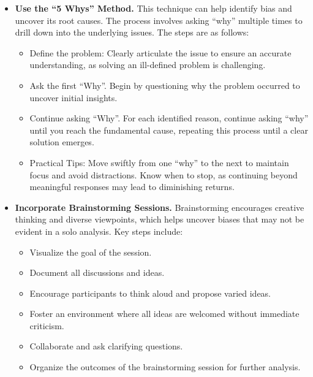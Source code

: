 \begin{itemize} 
    \item \textbf{Use the ``5 Whys'' Method.} This technique can help identify bias and uncover its root causes. The process involves asking ``why'' multiple times to drill down into the underlying issues. The steps are as follows:
        \begin{itemize} 
            \item Define the problem: Clearly articulate the issue to ensure an accurate understanding, as solving an ill-defined problem is challenging. 
            \item Ask the first ``Why''. Begin by questioning why the problem occurred to uncover initial insights. 
            \item Continue asking ``Why''. For each identified reason, continue asking ``why'' until you reach the fundamental cause, repeating this process until a clear solution emerges. 
            \item Practical Tips: Move swiftly from one ``why'' to the next to maintain focus and avoid distractions. Know when to stop, as continuing beyond meaningful responses may lead to diminishing returns. 
    \end{itemize}
    
    \item \textbf{Incorporate Brainstorming Sessions.}  Brainstorming encourages creative thinking and diverse viewpoints, which helps uncover biases that may not be evident in a solo analysis. Key steps include:
        \begin{itemize}
            \item Visualize the goal of the session.
            \item Document all discussions and ideas.
            \item Encourage participants to think aloud and propose varied ideas.
            \item Foster an environment where all ideas are welcomed without immediate criticism.
            \item Collaborate and ask clarifying questions.
            \item Organize the outcomes of the brainstorming session for further analysis.
        \end{itemize}
        

\end{itemize}
